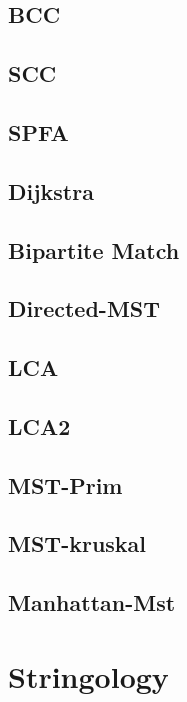 \documentclass[a4paper,10pt,twocolumn,oneside]{article}
\begin{document}
\subsection{BCC}

\subsection{SCC}

\subsection{SPFA}

\subsection{Dijkstra}

\subsection{Bipartite Match}

\subsection{Directed-MST}

\subsection{LCA}

\subsection{LCA2}

\subsection{MST-Prim}

\subsection{MST-kruskal}

\subsection{Manhattan-Mst}

\newpage

\section{Stringology}
\end{document}

